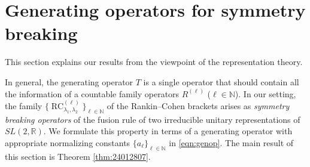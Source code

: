 \documentclass[12pt]{amsart}
\newcommand{\RC}{\operatorname{RC}}
\theoremstyle{plain} %
\theoremstyle{definition} %
\theoremstyle{remark} %
\begin{document}
\section{Generating operators for symmetry breaking}
\label{sec:SL2}

This section explains
 our results from the viewpoint
 of the representation theory.  



In general, 
 the generating operator $T$ is a single operator
 that should contain all the information of a countable family operators
 $R^{(\ell)}$ ($\ell \in {\mathbb{N}}$).  
In our setting, 
 the family $\{\RC_{\lambda_1, \lambda_2}^{(\ell)}\}_{\ell \in {\mathbb{N}}}$
 of the Rankin--Cohen brackets 
 arises as {\it{symmetry breaking operators}}
 of the fusion rule of two irreducible unitary representations
 of $SL(2,{\mathbb{R}})$.  
We formulate this property
 in terms of a generating operator
 with appropriate normalizing constants $\{a_{\ell}\}_{\ell \in {\mathbb{N}}}$
 in \eqref{eqn:genop}.  
The main result of this section
is Theorem \ref{thm:24012807}.  
\end{document}
